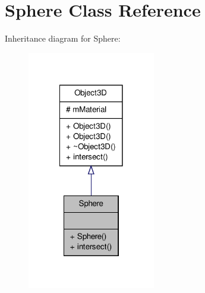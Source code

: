 \hypertarget{classSphere}{\section{\-Sphere \-Class \-Reference}
\label{classSphere}
}


\-Inheritance diagram for \-Sphere\-:
\nopagebreak
\begin{figure}[H]
\begin{center}
\leavevmode
\includegraphics[width=158pt]{classSphere__inherit__graph}
\end{center}
\end{figure}


